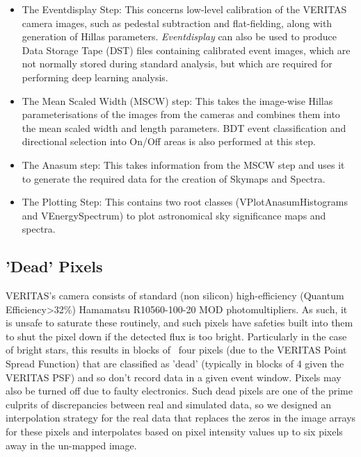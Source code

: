 \begin{itemize}
\item The Eventdisplay Step: This concerns low-level calibration of the VERITAS camera images, such as pedestal subtraction and flat-fielding, along with generation of Hillas parameters. \textit{Eventdisplay} can also be used to produce Data Storage Tape (DST) files containing calibrated event images, which are not normally stored during standard analysis, but which are required for performing deep learning analysis.

\item The Mean Scaled Width (MSCW) step: This takes the image-wise Hillas parameterisations of the images from the cameras and combines them into the mean scaled width and length parameters. BDT event classification and directional selection into On/Off areas is also performed at this step. 

\item The Anasum step: This takes information from the MSCW step and uses it to generate the required data for the creation of Skymaps and Spectra. 

\item The Plotting Step: This contains two root classes (VPlotAnasumHistograms and VEnergySpectrum) to plot astronomical sky significance maps and spectra.

\end{itemize}

\subsection{'Dead' Pixels}
VERITAS's camera consists of standard (non silicon) high-efficiency (Quantum Efficiency>32\%) \cite{vercam} Hamamatsu R10560-100-20 MOD photomultipliers. As such, it is unsafe to saturate these routinely, and such pixels have safeties built into them to shut the pixel down if the detected flux is too bright. Particularly in the case of bright stars, this results in blocks of ~four pixels (due to the VERITAS Point Spread Function) that are classified as 'dead' (typically in blocks of 4 given the VERITAS PSF) and so don't record data in a given event window. Pixels may also be turned off due to faulty electronics. Such dead pixels are one of the prime culprits of discrepancies between real and simulated data, so we designed an interpolation strategy for the real data that replaces the zeros in the image arrays for these pixels and interpolates based on pixel intensity values up to six pixels away in the un-mapped image.  


